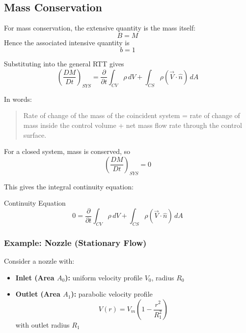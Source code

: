 \subsection{Mass Conservation}

For mass conservation, the extensive quantity is the mass itself:
\begin{equation}
    B=M
\end{equation}
Hence the associated intensive quantity is
\begin{equation}
    b=1
\end{equation}

Substituting into the general RTT gives
\begin{equation}
    \left(\frac{DM}{Dt}\right)_{SYS}
    =
    \frac{\partial}{\partial t}\int_{CV}\rho\,dV
    +
    \int_{CS}\rho(\vec{V}\cdot\hat{n})\,dA
\end{equation}

In words:
\begin{quote}
Rate of change of the mass of the coincident system
=
rate of change of mass inside the control volume
+
net mass flow rate through the control surface.
\end{quote}

For a closed system, mass is conserved, so
\begin{equation}
    \left(\frac{DM}{Dt}\right)_{SYS}=0
\end{equation}

This gives the integral continuity equation:
\begin{eqbox}{Continuity Equation}
\begin{equation*}
    0
    =
    \frac{\partial}{\partial t}\int_{CV}\rho\,dV
    +
    \int_{CS}\rho(\vec{V}\cdot\hat{n})\,dA
\end{equation*}
\end{eqbox}

\subsubsection{Example: Nozzle (Stationary Flow)}

Consider a nozzle with:
\begin{itemize}
    \item \textbf{Inlet (Area $A_0$):} uniform velocity profile $V_0$, radius $R_0$
    \item \textbf{Outlet (Area $A_1$):} parabolic velocity profile
    \begin{equation}
        V(r)=V_m\left(1-\frac{r^2}{R_1^2}\right)
    \end{equation}
    with outlet radius $R_1$
\end{itemize}

